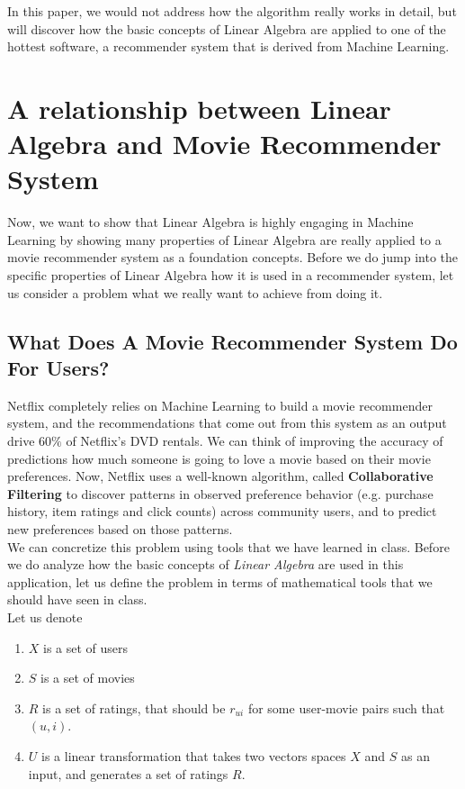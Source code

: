 \documentclass[paper=a4, fontsize=12pt]{scrartcl} %
\numberwithin{equation}{section} %
\numberwithin{figure}{section} %
\numberwithin{table}{section} %
\begin{document}
In this paper, we would not address how the algorithm really works in detail,
but will discover how the basic concepts of Linear Algebra are
applied to one of the hottest software, a recommender system that is derived
from Machine Learning.

\section{A relationship between Linear Algebra and Movie Recommender System}

Now, we want to show that Linear Algebra is highly engaging in Machine Learning
by showing many properties of Linear Algebra are really  applied to a movie
recommender system as a foundation concepts. Before we do jump into the specific
properties of Linear Algebra how it is used in a recommender system,
let us consider a problem what we really want to achieve from doing it.

\bigskip

\subsection{What Does A Movie Recommender System Do For Users?}

Netflix completely relies on Machine Learning to build a movie recommender system, and
the recommendations that come out from this system as an output drive \(60\%\)
of Netflix's DVD rentals. We can think of improving the accuracy of predictions
how much someone is going to love a movie based on their movie preferences.
Now, Netflix uses a well-known algorithm, called \textbf{Collaborative Filtering} to discover
patterns in observed preference behavior (e.g. purchase history, item ratings and click counts) across
community users, and to predict new preferences based on those patterns. \\

We can concretize this problem using tools that we have learned in class.
Before we do analyze how the basic concepts of \textit{Linear Algebra} are used in this application,
let us define the problem in terms of mathematical tools that we should have seen
in class. \\

Let us denote

\begin{enumerate}
	\item \(X\) is a set of users
	\item \(S\) is a set of movies
  \item \(R\) is a set of ratings, that should be \(r_{ui}\) for some user-movie
    pairs such that \((u,i)\).
  \item \(U\) is a linear transformation that takes two vectors spaces \(X\) and
    \(S\) as an input, and generates a set of ratings \(R\).
  \end{enumerate}
\end{document}
